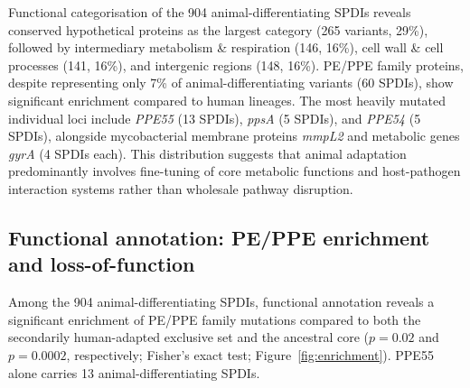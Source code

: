 \documentclass[11pt,a4paper]{article}
\begin{document}
Functional categorisation of the 904 animal-differentiating SPDIs reveals conserved hypothetical proteins as the largest category (265 variants, 29\%), followed by intermediary metabolism \& respiration (146, 16\%), cell wall \& cell processes (141, 16\%), and intergenic regions (148, 16\%). PE/PPE family proteins, despite representing only 7\% of animal-differentiating variants (60 SPDIs), show significant enrichment compared to human lineages. The most heavily mutated individual loci include \textit{PPE55} (13 SPDIs), \textit{ppsA} (5 SPDIs), and \textit{PPE54} (5 SPDIs), alongside mycobacterial membrane proteins \textit{mmpL2} and metabolic genes \textit{gyrA} (4 SPDIs each). This distribution suggests that animal adaptation predominantly involves fine-tuning of core metabolic functions and host-pathogen interaction systems rather than wholesale pathway disruption.

\subsection{Functional annotation: PE/PPE enrichment and loss-of-function}
\label{sec:results:functional}

Among the 904 animal-differentiating SPDIs, functional annotation reveals a significant
enrichment of PE/PPE family mutations compared to both the secondarily human-adapted exclusive
set and the ancestral core ($p = 0.02$ and $p = 0.0002$, respectively; Fisher's
exact test; Figure~\ref{fig:enrichment}).
%
PPE55 alone carries 13 animal-differentiating SPDIs.
\end{document}
